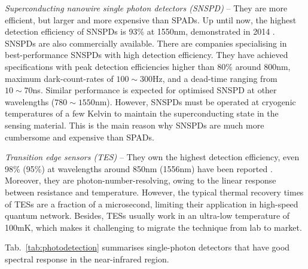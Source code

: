 \textit{Superconducting nanowire single photon detectors (SNSPD)} -- They are more efficient, but larger and more expensive than SPADs. Up until now, the highest detection efficiency of SNSPDs is 93\% at 1550nm, demonstrated in 2014 \cite{bib:marsili2013}. SNSPDs are also commercially available. There are companies specialising in best-performance SNSPDs with high detection efficiency. They have achieved specifications with peak detection efficiencies higher than 80\% around 800nm, maximum dark-count-rates of \mbox{$100\sim 300$Hz}, and a dead-time ranging from \mbox{$10\sim 70$ns}. Similar performance is expected for optimised SNSPD at other wavelengths (\mbox{$780\sim 1550$nm}). However, SNSPDs must be operated at cryogenic temperatures of a few Kelvin to maintain the superconducting state in the sensing material. This is the main reason why SNSPDs are much more cumbersome and expensive than SPADs.

\textit{Transition edge sensors (TES)} -- They own the highest detection efficiency, even 98\% (95\%) at wavelengths around 850nm (1556nm) have been reported \cite{bib:fukuda2011, bib:lita2008}. Moreover, they are photon-number-resolving, owing to the linear response between resistance and temperature. However, the typical thermal recovery times of TESs are a fraction of a microsecond, limiting their application in high-speed quantum network. Besides, TESs usually work in an ultra-low temperature of 100mK, which makes it challenging to migrate the technique from lab to market.

Tab.~\ref{tab:photodetection} summarises single-photon detectors that have good spectral response in the near-infrared region.


